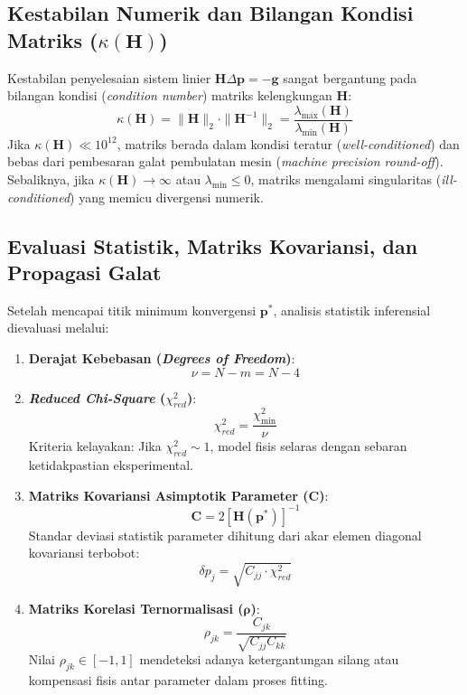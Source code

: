 \subsection*{Kestabilan Numerik dan Bilangan Kondisi Matriks (\texorpdfstring{$\kappa(\mathbf{H})$}{kappa(H)})}
Kestabilan penyelesaian sistem linier $\mathbf{H}\Delta\mathbf{p} = -\mathbf{g}$ sangat bergantung pada bilangan kondisi (\textit{condition number}) matriks kelengkungan $\mathbf{H}$:
\begin{equation}
    \kappa(\mathbf{H}) = \|\mathbf{H}\|_2 \cdot \|\mathbf{H}^{-1}\|_2 = \frac{\lambda_{\max}(\mathbf{H})}{\lambda_{\min}(\mathbf{H})}
    \label{eq:condition_number}
\end{equation}
Jika $\kappa(\mathbf{H}) \ll 10^{12}$, matriks berada dalam kondisi teratur (\textit{well-conditioned}) dan bebas dari pembesaran galat pembulatan mesin (\textit{machine precision round-off}). Sebaliknya, jika $\kappa(\mathbf{H}) \to \infty$ atau $\lambda_{\min} \le 0$, matriks mengalami singularitas (\textit{ill-conditioned}) yang memicu divergensi numerik.

\subsection*{Evaluasi Statistik, Matriks Kovariansi, dan Propagasi Galat}
Setelah mencapai titik minimum konvergensi $\mathbf{p}^*$, analisis statistik inferensial dievaluasi melalui:
\begin{enumerate}
    \item \textbf{Derajat Kebebasan (\textit{Degrees of Freedom})}:
    \begin{equation}
        \nu = N - m = N - 4
        \label{eq:dof}
    \end{equation}
    \item \textbf{\textit{Reduced Chi-Square} ($\chi^2_{red}$)}:
    \begin{equation}
        \chi^2_{red} = \frac{\chi^2_{\min}}{\nu}
        \label{eq:chi2_red}
    \end{equation}
    Kriteria kelayakan: Jika $\chi^2_{red} \sim 1$, model fisis selaras dengan sebaran ketidakpastian eksperimental.
    \item \textbf{Matriks Kovariansi Asimptotik Parameter ($\mathbf{C}$)}:
    \begin{equation}
        \mathbf{C} = 2 [\mathbf{H}(\mathbf{p}^*)]^{-1}
        \label{eq:cov_matrix}
    \end{equation}
    Standar deviasi statistik parameter dihitung dari akar elemen diagonal kovariansi terbobot:
    \begin{equation}
        \delta p_j = \sqrt{C_{jj} \cdot \chi^2_{red}}
        \label{eq:param_error}
    \end{equation}
    \item \textbf{Matriks Korelasi Ternormalisasi ($\boldsymbol{\rho}$)}:
    \begin{equation}
        \rho_{jk} = \frac{C_{jk}}{\sqrt{C_{jj} C_{kk}}}
        \label{eq:corr_matrix}
    \end{equation}
    Nilai $\rho_{jk} \in [-1, 1]$ mendeteksi adanya ketergantungan silang atau kompensasi fisis antar parameter dalam proses fitting.
\end{enumerate}
